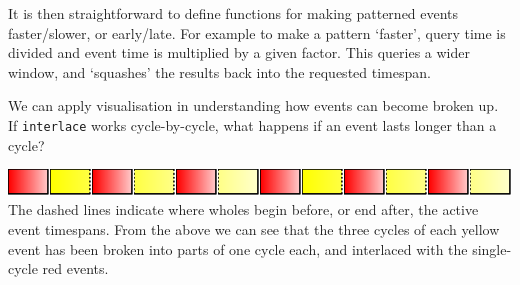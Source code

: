 It is then straightforward to define functions for making patterned
events faster/slower, or early/late. For example to make a pattern
`faster', query time is divided and event time is multiplied by a given
factor. This queries a wider window, and `squashes' the results back
into the requested timespan.

\begin{Shaded}
\begin{Highlighting}[]
  \OtherTok{{-}\textgreater{}} \OtherTok{{-}\textgreater{}} 
\OtherTok{=}\OperatorTok{/}\OperatorTok{*}
\OtherTok{=}\OperatorTok{*}\OperatorTok{/}
\OtherTok{=}\OperatorTok{+}
\OtherTok{=}\OperatorTok{+}
\end{Highlighting}
\end{Shaded}

We can apply visualisation in understanding how events can become broken
up. If \texttt{interlace} works cycle-by-cycle, what happens if an event
lasts longer than a cycle?

\begin{Shaded}
\begin{Highlighting}[]
\OtherTok{=}\NormalTok{ interlace [atom } \OperatorTok{$}\NormalTok{]}
\end{Highlighting}
\end{Shaded}

\includegraphics{../figures/fig4.pdf}\\

The dashed lines indicate where wholes begin before, or end after, the
active event timespans. From the above we can see that the three cycles
of each yellow event has been broken into parts of one cycle each, and
interlaced with the single-cycle red events.

